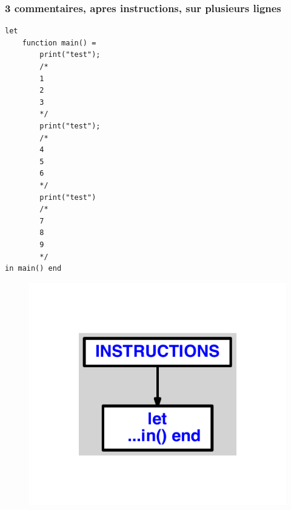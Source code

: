 \documentclass{article}
\begin{document}
\subsubsection{3 commentaires, apres instructions, sur plusieurs lignes}
\begin{lstlisting}
let
	function main() =
		print("test");
		/*
		1
		2
		3
		*/
		print("test");
		/*
		4
		5
		6
		*/
		print("test")
		/*
		7
		8
		9
		*/
in main() end
\end{lstlisting}
\newpage
\begin{figure}[H]
\centering
\includegraphics[max width=\textwidth]{ast/ast_161.pdf}
\end{figure}
\newpage
\end{document}
